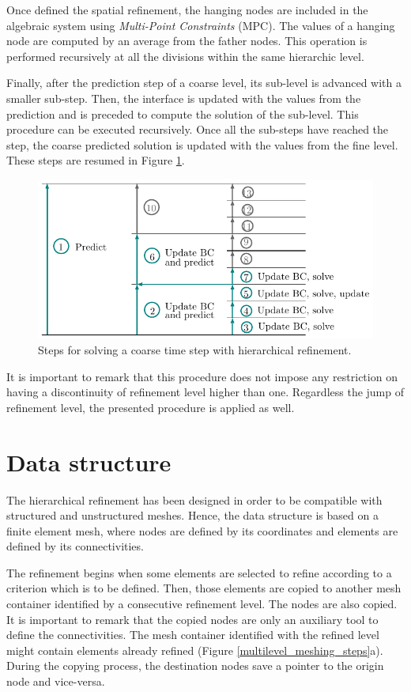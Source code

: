 Once defined the spatial refinement, the hanging nodes are included in the algebraic system using \emph{Multi-Point Constraints} (MPC). The values of a hanging node are computed by an average from the father nodes. This operation is performed recursively at all the divisions within the same hierarchic level.

Finally, after the prediction step of a coarse level, its sub-level is advanced with a smaller sub-step. Then, the interface is updated with the values from the prediction and is preceded to compute the solution of the sub-level. This procedure can be executed recursively. Once all the sub-steps have reached the step, the coarse predicted solution is updated with the values from the fine level. These steps are resumed in Figure \ref{multilevel_steps}.

\begin{figure} [htpb]
    \centering
    \includegraphics[width=.8\textwidth]{img/multigrid/multilevel_steps.pdf}
    \caption{Steps for solving a coarse time step with hierarchical refinement.}
    \label{multilevel_steps}
\end{figure}

It is important to remark that this procedure does not impose any restriction on having a discontinuity of refinement level higher than one. Regardless the jump of refinement level, the presented procedure is applied as well.



\section{Data structure}

The hierarchical refinement has been designed in order to be compatible with structured and unstructured meshes. Hence, the data structure is based on a finite element mesh, where nodes are defined by its coordinates and elements are defined by its connectivities.

The refinement begins when some elements are selected to refine according to a criterion which is to be defined. Then, those elements are copied to another mesh container identified by a consecutive refinement level. The nodes are also copied. It is important to remark that the copied nodes are only an auxiliary tool to define the connectivities. The mesh container identified with the refined level might contain elements already refined (Figure \ref{multilevel_meshing_steps}{\color{wrmBlue}a}). During the copying process, the destination nodes save a pointer to the origin node and vice-versa.

